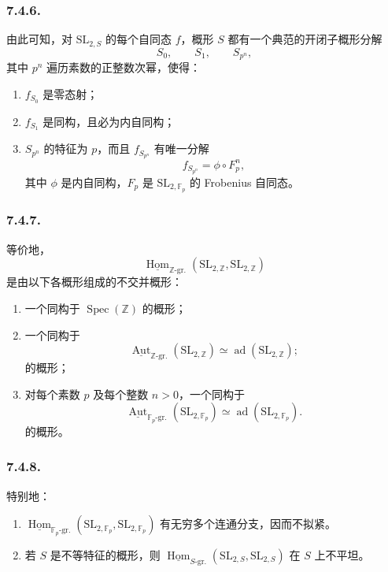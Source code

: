 \subsubsection*{7.4.6.}
由此可知，对 \(\mathrm{SL}_{2,S}\) 的每个自同态 \(f\)，概形 \(S\) 都有一个典范的开闭子概形分解
\[
  S_0,\qquad S_1,\qquad S_{p^n},
\]
其中 \(p^n\) 遍历素数的正整数次幂，使得：
\begin{enumerate}
\item[(i)] \(f_{S_0}\) 是零态射；
\item[(ii)] \(f_{S_1}\) 是同构，且必为内自同构；
\item[(iii)] \(S_{p^n}\) 的特征为 \(p\)，而且 \(f_{S_{p^n}}\) 有唯一分解
  \[
    f_{S_{p^n}}=\phi\circ F_p^n,
  \]
  其中 \(\phi\) 是内自同构，\(F_p\) 是 \(\mathrm{SL}_{2,\mathbb F_p}\) 的 Frobenius 自同态。
\end{enumerate}

\subsubsection*{7.4.7.}
等价地，
\[
  \underline{\operatorname{Hom}}_{\mathbb Z\text{-}\mathrm{gr.}}
    (\mathrm{SL}_{2,\mathbb Z},\mathrm{SL}_{2,\mathbb Z})
\]
是由以下各概形组成的不交并概形：
\begin{enumerate}
\item[(i)] 一个同构于 \(\operatorname{Spec}(\mathbb Z)\) 的概形；
\item[(ii)] 一个同构于
  \[
    \underline{\operatorname{Aut}}_{\mathbb Z\text{-}\mathrm{gr.}}
      (\mathrm{SL}_{2,\mathbb Z})
    \simeq
    \operatorname{ad}(\mathrm{SL}_{2,\mathbb Z});
  \]
  的概形；
\item[(iii)] 对每个素数 \(p\) 及每个整数 \(n>0\)，一个同构于
  \[
    \underline{\operatorname{Aut}}_{\mathbb F_p\text{-}\mathrm{gr.}}
      (\mathrm{SL}_{2,\mathbb F_p})
    \simeq
    \operatorname{ad}(\mathrm{SL}_{2,\mathbb F_p}).
  \]
  的概形。
\end{enumerate}

\subsubsection*{7.4.8.}
特别地：
\begin{enumerate}
\item[(i)] \(\underline{\operatorname{Hom}}_{\mathbb F_p\text{-}\mathrm{gr.}}(\mathrm{SL}_{2,\mathbb F_p},\mathrm{SL}_{2,\mathbb F_p})\) 有无穷多个连通分支，因而不拟紧。
\item[(ii)] 若 \(S\) 是不等特征的概形，则 \(\underline{\operatorname{Hom}}_{S\text{-}\mathrm{gr.}}(\mathrm{SL}_{2,S},\mathrm{SL}_{2,S})\) 在 \(S\) 上不平坦。
\end{enumerate}

